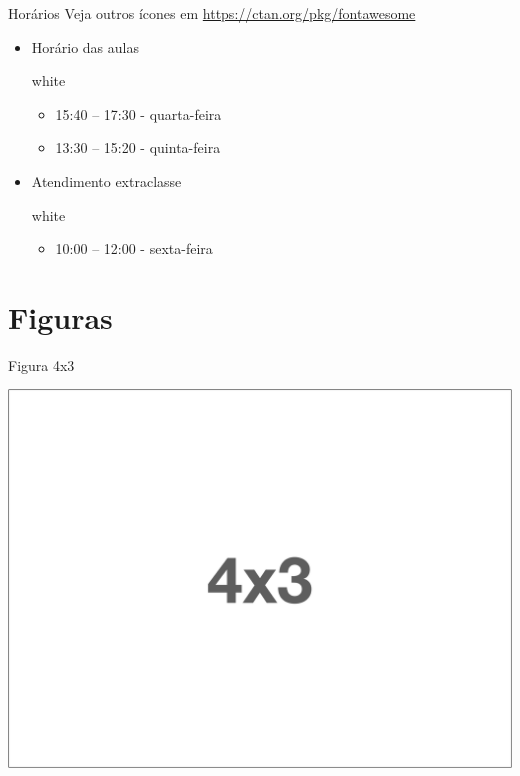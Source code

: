 \documentclass[aspectratio=169]{beamer}
\begin{document}
\begin{frame}{Horários}
    {Veja outros ícones em \url{https://ctan.org/pkg/fontawesome}}
    \begin{itemize}
        \item Horário das aulas 
        \begin{caixa}[azul]{white}{\faCalendar}
            \begin{itemize}
                \item 15:40 -- 17:30 - quarta-feira
                \item 13:30 -- 15:20 - quinta-feira
            \end{itemize}
        \end{caixa}
        \item Atendimento extraclasse
        \begin{caixa}[azul]{white}{\faCalendar}
            \begin{itemize}
                \item 10:00 -- 12:00 - sexta-feira
            \end{itemize}
        \end{caixa}
    \end{itemize}
\end{frame}


\section{Figuras}

\begin{frame}{Figura 4x3}
    \begin{center}
        \includegraphics[height=.8\paperheight]{figs/4x3.png}
    \end{center}
\end{frame}
    
\end{document}

